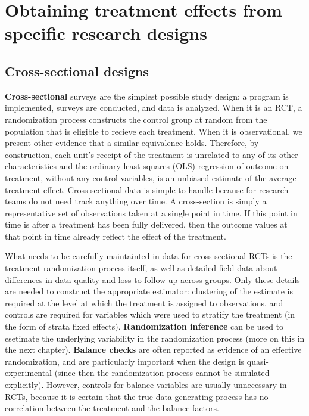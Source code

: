 \section{Obtaining treatment effects from specific research designs}


\subsection{Cross-sectional designs}

\textbf{Cross-sectional} surveys are the simplest possible study design:
a program is implemented, surveys are conducted, and data is analyzed.
When it is an RCT, a randomization process constructs the control group at random
from the population that is eligible to recieve each treatment.
When it is observational, we present other evidence that a similar equivalence holds.
Therefore, by construction, each unit's receipt of the treatment
is unrelated to any of its other characteristics
and the ordinary least squares (OLS) regression
of outcome on treatment, without any control variables,
is an unbiased estimate of the average treatment effect.
Cross-sectional data is simple to handle because
for research teams do not need track anything over time.
A cross-section is simply a representative set of observations
taken at a single point in time.
If this point in time is after a treatment has been fully delivered,
then the outcome values at that point in time
already reflect the effect of the treatment.

What needs to be carefully maintainted in data for cross-sectional RCTs
is the treatment randomization process itself,
as well as detailed field data about differences
in data quality and loss-to-follow up across groups.\cite{athey2017econometrics}
Only these details are needed to construct the appropriate estimator:
clustering of the estimate is required at the level
at which the treatment is assigned to observations,
and controls are required for variables which
were used to stratify the treatment (in the form of strata fixed effects).
\textbf{Randomization inference} can be used
to esetimate the underlying variability in the randomization process
(more on this in the next chapter).
\textbf{Balance checks} are often reported as evidence of an effective randomization,
and are particularly important when the design is quasi-experimental
(since then the randomization process cannot be simulated explicitly).
However, controls for balance variables are usually unnecessary in RCTs,
because it is certain that the true data-generating process
has no correlation between the treatment and the balance factors.

